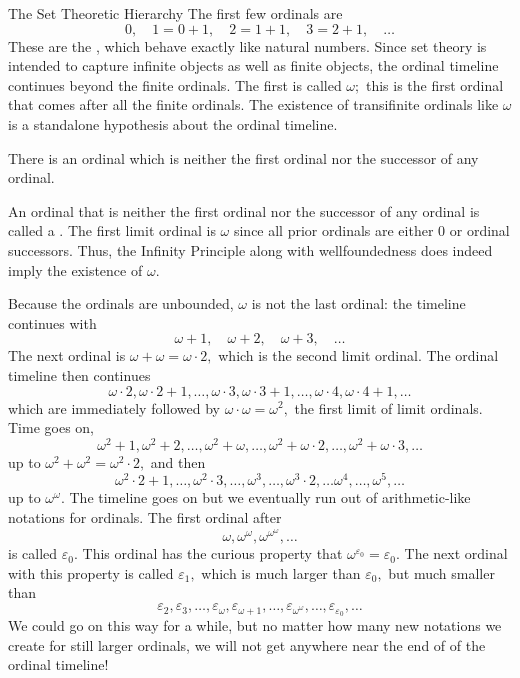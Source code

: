 \begin{unit}{The Set Theoretic Hierarchy}
The first few ordinals are \[0,\quad 1 = 0+1,\quad 2 = 1+1,\quad 3 = 2+1,\quad \ldots\]
These are the , which behave exactly like natural numbers.
Since set theory is intended to capture infinite objects as well as finite objects, the ordinal timeline continues beyond the finite ordinals.
The first  is called \(\omega;\) this is the first ordinal that comes after all the finite ordinals.
The existence of transifinite ordinals like \(\omega\) is a standalone hypothesis about the ordinal timeline.

\begin{infinity}
  There is an ordinal which is neither the first ordinal nor the successor of any ordinal.
\end{infinity}

\noindent
An ordinal that is neither the first ordinal nor the successor of any ordinal is called a .
The first limit ordinal is \(\omega\) since all prior ordinals are either \(0\) or ordinal successors.
Thus, the Infinity Principle along with wellfoundedness does indeed imply the existence of \(\omega.\)

Because the ordinals are unbounded, \(\omega\) is not the last ordinal: the timeline continues with \[\omega+1, \quad \omega+2,\quad \omega+3, \quad\ldots\]
The next ordinal is \(\omega+\omega = \omega\cdot2,\) which is the second limit ordinal.
The ordinal timeline then continues
\[\omega\cdot2,\omega\cdot2+1,\ldots,
\omega\cdot3,\omega\cdot3+1,\ldots,
\omega\cdot4,\omega\cdot4+1,\ldots\]
which are immediately followed by \(\omega\cdot\omega = \omega^2,\) the first limit of limit ordinals.
Time goes on,
\[\omega^2+1,\omega^2+2,\dots,
\omega^2+\omega,\dots, 
\omega^2+\omega\cdot2,\dots,
\omega^2+\omega\cdot3,\dots\] 
up to \(\omega^2+\omega^2 = \omega^2\cdot2,\) and then 
\[\omega^2\cdot2+1,\dots,
\omega^2\cdot3,\dots,
\omega^3,\dots,\omega^3\cdot2,\dots
\omega^4,\dots,
\omega^5,\dots\]
up to \(\omega^\omega.\)
The timeline goes on but we eventually run out of arithmetic-like notations for ordinals.
The first ordinal after \[\omega, \omega^\omega, \omega^{\omega^\omega}, \dots\] is called \(\varepsilon_0.\)
This ordinal has the curious property that \(\omega^{\varepsilon_0} = \varepsilon_0.\)
The next ordinal with this property is called \(\varepsilon_1,\) which is much larger than \(\varepsilon_0,\) but much smaller than \[\varepsilon_2,\varepsilon_3,\dots,\varepsilon_{\omega},\varepsilon_{\omega+1},\dots,\varepsilon_{\omega^\omega},\dots,\varepsilon_{\varepsilon_0},\dots\]
We could go on this way for a while, but no matter how many new notations we create for still larger ordinals, we will not get anywhere near the end of of the ordinal timeline!




\end{unit}
